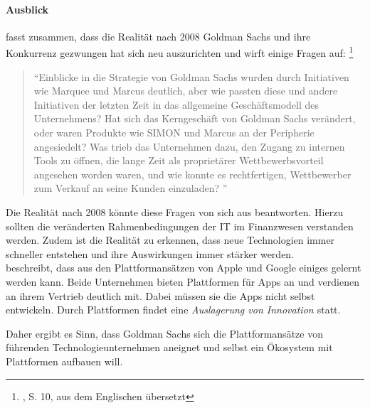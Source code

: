 \paragraph{Ausblick}
\citet{Gupta:2017} fasst zusammen, dass die Realität nach 2008 Goldman Sachs und ihre Konkurrenz gezwungen hat sich neu auszurichten und wirft einige Fragen auf: \footnote{\citet{Gupta:2017}, S. 10, aus dem Englischen übersetzt}
\begin{quote}
\enquote{Einblicke in die Strategie von Goldman Sachs wurden durch Initiativen wie Marquee und Marcus deutlich, aber wie passten diese und andere Initiativen der letzten Zeit in das allgemeine Geschäftsmodell des Unternehmens? Hat sich das Kerngeschäft von Goldman Sachs verändert, oder waren Produkte wie SIMON und Marcus an der Peripherie angesiedelt? Was trieb das Unternehmen dazu, den Zugang zu internen Tools zu öffnen, die lange Zeit als proprietärer Wettbewerbsvorteil angesehen worden waren, und wie konnte es rechtfertigen, Wettbewerber zum Verkauf an seine Kunden einzuladen?
    }
\end{quote}
Die Realität nach 2008 könnte diese Fragen von sich aus beantworten. Hierzu sollten die veränderten Rahmenbedingungen der IT im Finanzwesen verstanden werden. Zudem ist die Realität zu erkennen, dass neue Technologien immer schneller entstehen und ihre Auswirkungen immer stärker werden. 
\medskip
\\
\citet{Eismann2015} beschreibt, dass aus den Plattformansätzen von Apple und Google einiges gelernt werden kann. Beide Unternehmen bieten Plattformen für Apps an und verdienen an ihrem Vertrieb deutlich mit. Dabei müssen sie die Apps nicht selbst entwickeln. Durch Plattformen findet eine \emph{Auslagerung von Innovation \cite{Eismann2015}} statt.

Daher ergibt es Sinn, dass Goldman Sachs sich die Plattformansätze von führenden Technologieunternehmen aneignet und selbst ein Ökosystem mit Plattformen aufbauen will. 

